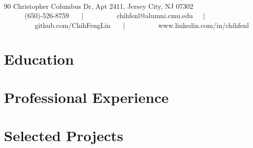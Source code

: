 \documentclass[10pt]{article} %
\begin{document}
\color{text1} %


\par{\\[0.5\baselineskip] %

{ 90 Christopher Columbus Dr, Apt 2411, Jersey City, NJ 07302}\\

{\ \ \ \faMobilePhone \ \ \  (650)-526-8759 \ \ \ | \ \ \  
\  \ \ \faEnvelope \ \ \ chihfenl@alumni.cmu.edu\ \ \ | \ \ \   
\  \ \ \faGithub \ \ \ github.com/ChihFengLin \ \ \ | \ \ \  
\  \ \ \faLinkedin \ \ \ www.linkedin.com/in/chihfenl }
	

\section{Education}



\vspace{-\abovedisplayskip}
\begin{minipage}[t]{0.5\textwidth} %
\vspace{0pt} %



\section{Professional Experience} 



\section{Selected Projects} 




\end{minipage} %
\hfill
\begin{minipage}[t]{0.47\textwidth} %
\vspace{0pt} %




\end{minipage}}
\end{document}
